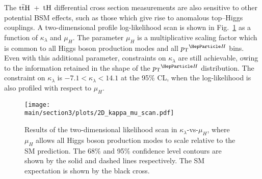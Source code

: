 The $\text{t}\overline{\text{t}}\text{H}$~+~$\text{tH}$ differential cross section measurements are also sensitive to other potential BSM effects, such as those which give rise to anomalous top--Higgs couplings. A two-dimensional profile log-likelihood scan is shown in  Fig.~\ref{fig:ttHdiff_CMS_klambda_2Dscan} as a function of $\kappa_\lambda$ and $\mu_{H}$. The parameter $\mu_{H}$ is a multiplicative scaling factor which is common to all Higgs boson production modes and all $\pTH$ bins. Even with this additional parameter, constraints on $\kappa_\lambda$ are still achievable, owing to the information retained in the shape of the $\pTH$ distribution. The constraint on $\kappa_\lambda$ is $-7.1 < \kappa_\lambda < 14.1$ at the 95\% CL, when the log-likelihood is also profiled with respect to $\mu_{H}$. 

\begin{figure}[htb!]
        \centering
        \texttt{[image: \\main/section3/plots/2D\_kappa\_mu\_scan.pdf]}
        \caption{Results of the two-dimensional likelihood scan in $\kappa_\lambda$-vs-$\mu_{H}$, where $\mu_{H}$ allows all Higgs boson production modes to scale relative to the SM prediction. The 68\% and 95\% confidence level contours are shown by the solid and dashed lines respectively. The SM expectation is shown by the black cross.}
        \label{fig:ttHdiff_CMS_klambda_2Dscan}
\end{figure}


